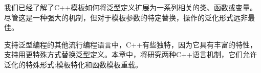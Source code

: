 我们已经了解了C++模板如何将泛型定义扩展为一系列相关的类、函数或变量。尽管这是一种强大的机制，但对于模板参数的特定替换，操作的泛化形式远非最佳。

支持泛型编程的其他流行编程语言中，C++有些独特，因为它具有丰富的特性，支持用更特殊方式替换泛型定义。本章中，将研究两种C++语言机制，它们允许泛化的特殊形式:模板特化和函数模板重载。